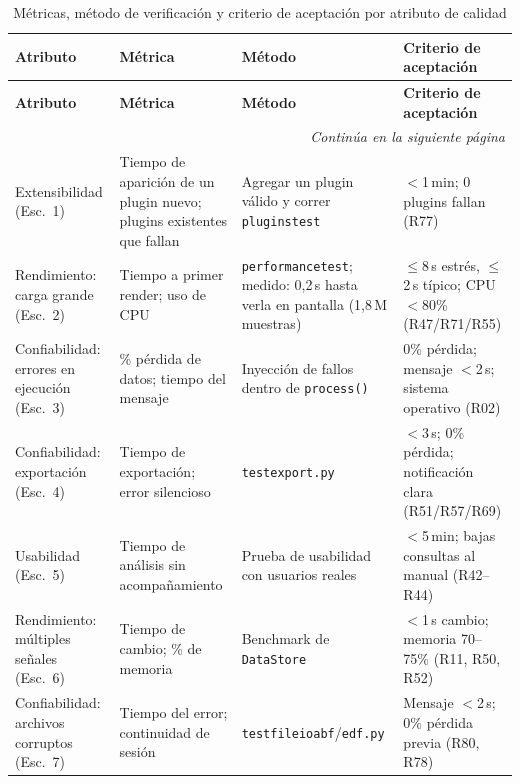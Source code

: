 \documentclass[11pt,a4paper]{article}
\DeclareRobustCommand{\_}{\textunderscore\allowbreak}
\begin{document}
\begin{center}
\small
\begin{longtable}{|p{}|p{}|p{}|p{}|}
\caption{M\'etricas, m\'etodo de verificaci\'on y criterio de aceptaci\'on por atributo de calidad} \label{tab:metricas} \\
\hline
\textbf{Atributo} & \textbf{M\'etrica} & \textbf{M\'etodo} & \textbf{Criterio de aceptaci\'on} \\
\hline
\endfirsthead
\hline
\textbf{Atributo} & \textbf{M\'etrica} & \textbf{M\'etodo} & \textbf{Criterio de aceptaci\'on} \\
\hline
\endhead
\hline
\multicolumn{4}{r}{\textit{Contin\'ua en la siguiente p\'agina}} \\
\endfoot
\hline
\endlastfoot

Extensibilidad (Esc.~1) &
Tiempo de aparici\'on de un plugin nuevo; plugins existentes que fallan &
Agregar un plugin v\'alido y correr \texttt{plugins\_\allowbreak test} &
$<$1\,min; 0 plugins fallan (R77) \\
\hline

Rendimiento: carga grande (Esc.~2) &
Tiempo a primer render; uso de CPU &
\texttt{performance\_\allowbreak test}; medido: 0,2\,s hasta verla en pantalla (1,8\,M muestras) &
$\leq$8\,s estr\'es, $\leq$2\,s t\'ipico; CPU $<$80\% (R47/R71/R55) \\
\hline

Confiabilidad: errores en ejecuci\'on (Esc.~3) &
\% p\'erdida de datos; tiempo del mensaje &
Inyecci\'on de fallos dentro de \texttt{process()} &
0\% p\'erdida; mensaje $<$2\,s; sistema operativo (R02) \\
\hline

Confiabilidad: exportaci\'on (Esc.~4) &
Tiempo de exportaci\'on; error silencioso &
\texttt{test\_\allowbreak export.py} &
$<$3\,s; 0\% p\'erdida; notificaci\'on clara (R51/R57/R69) \\
\hline

Usabilidad (Esc.~5) &
Tiempo de an\'alisis sin acompa\~namiento &
Prueba de usabilidad con usuarios reales &
$<$5\,min; bajas consultas al manual (R42--R44) \\
\hline

Rendimiento: m\'ultiples se\~nales (Esc.~6) &
Tiempo de cambio; \% de memoria &
Benchmark de \texttt{DataStore} &
$<$1\,s cambio; memoria 70--75\% (R11, R50, R52) \\
\hline

Confiabilidad: archivos corruptos (Esc.~7) &
Tiempo del error; continuidad de sesi\'on &
\texttt{test\_\allowbreak fileio\_\allowbreak abf}/\texttt{edf.py} &
Mensaje $<$2\,s; 0\% p\'erdida previa (R80, R78) \\
\hline


\end{longtable}
\end{center}
\end{document}
